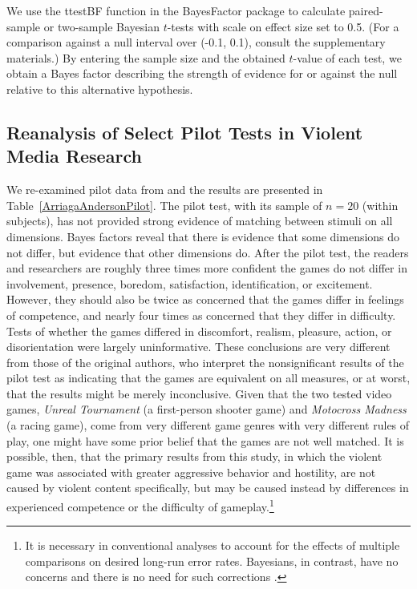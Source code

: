 \documentclass[man]{apa6}
\begin{document}
We use the ttestBF function in the BayesFactor package \citep{Morey:Rouder:2014} to calculate paired-sample or two-sample Bayesian $t$-tests with scale on effect size set to 0.5. (For a comparison against a null interval over (-0.1, 0.1), consult the supplementary materials.) By entering the sample size and the obtained $t$-value of each test, we obtain a Bayes factor describing the strength of evidence for or against the null relative to this alternative hypothesis.  

\subsection{Reanalysis of Select Pilot Tests in Violent Media Research}
We re-examined pilot data from \citet{Arriaga:etal:2008} and the results are presented in Table~\ref{ArriagaAndersonPilot}. The pilot test, with its sample of $n = 20$ (within subjects), has not provided strong evidence of matching between stimuli on all dimensions. Bayes factors reveal that there is evidence that some dimensions do not differ, but evidence that other dimensions do. After the pilot test, the readers and researchers are roughly three times more confident the games do not differ in involvement, presence, boredom, satisfaction, identification, or excitement. However, they should also be twice as concerned that the games differ in feelings of competence, and nearly four times as concerned that they differ in difficulty. Tests of whether the games differed in discomfort, realism, pleasure, action, or disorientation were largely uninformative. These conclusions are very different from those of the original authors, who interpret the nonsignificant results of the pilot test as indicating that the games are equivalent on all measures, or at worst, that the results might be merely inconclusive. Given that the two tested video games, {\em Unreal Tournament} (a first-person shooter game) and {\em Motocross Madness} (a racing game), come from very different game genres with very different rules of play, one might have some prior belief that the games are not well matched.  It is possible, then, that the primary results from this study, in which the violent game was associated with greater aggressive behavior and hostility, 
are not caused by violent content specifically, but may be caused instead by differences in experienced competence or the difficulty of gameplay.\footnote{It is necessary in conventional analyses to account for the effects of multiple comparisons on desired long-run error rates.  Bayesians, in contrast, have no concerns and there is no need for such corrections \citep{Royall:1997,Dienes:2011}.}
\end{document}
